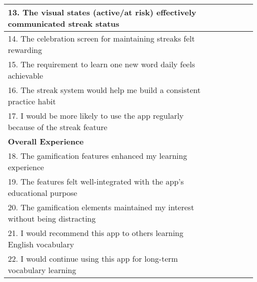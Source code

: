 \begin{table}[h]
\begin{tabular}{|p{}|c|c|c|c|c|}
        \hline
        13. The visual states (active/at risk) effectively communicated streak status & & & & & \\
        \hline
        14. The celebration screen for maintaining streaks felt rewarding & & & & & \\
        \hline
        15. The requirement to learn one new word daily feels achievable & & & & & \\
        \hline
        16. The streak system would help me build a consistent practice habit & & & & & \\
        \hline
        17. I would be more likely to use the app regularly because of the streak feature & & & & & \\
        \hline
        \multicolumn{6}{|l|}{\textbf{Overall Experience}} \\
        \hline
        18. The gamification features enhanced my learning experience & & & & & \\
        \hline
        19. The features felt well-integrated with the app's educational purpose & & & & & \\
        \hline
        20. The gamification elements maintained my interest without being distracting & & & & & \\
        \hline
        21. I would recommend this app to others learning English vocabulary & & & & & \\
        \hline
        22. I would continue using this app for long-term vocabulary learning & & & & & \\
        \hline
    \end{tabular}
\end{table}